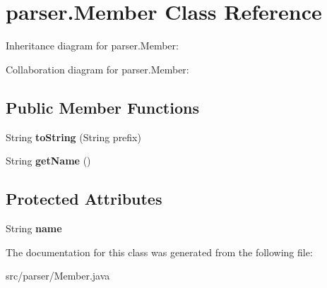 \hypertarget{classparser_1_1_member}{}\section{parser.\+Member Class Reference}
\label{classparser_1_1_member}


Inheritance diagram for parser.\+Member\+:


Collaboration diagram for parser.\+Member\+:
\subsection*{Public Member Functions}
\begin{DoxyCompactItemize}
\item 
String {\bfseries to\+String} (String prefix)\hypertarget{classparser_1_1_member_acfb37f5cc3353a983574ab040ddf0646}{}\label{classparser_1_1_member_acfb37f5cc3353a983574ab040ddf0646}

\item 
String {\bfseries get\+Name} ()\hypertarget{classparser_1_1_member_a1ba54b568d5ef604024a68e50e369740}{}\label{classparser_1_1_member_a1ba54b568d5ef604024a68e50e369740}

\end{DoxyCompactItemize}
\subsection*{Protected Attributes}
\begin{DoxyCompactItemize}
\item 
String {\bfseries name}\hypertarget{classparser_1_1_member_a58c68555d13b684b366bc0781012c462}{}\label{classparser_1_1_member_a58c68555d13b684b366bc0781012c462}

\end{DoxyCompactItemize}


The documentation for this class was generated from the following file\+:\begin{DoxyCompactItemize}
\item 
src/parser/Member.\+java\end{DoxyCompactItemize}

